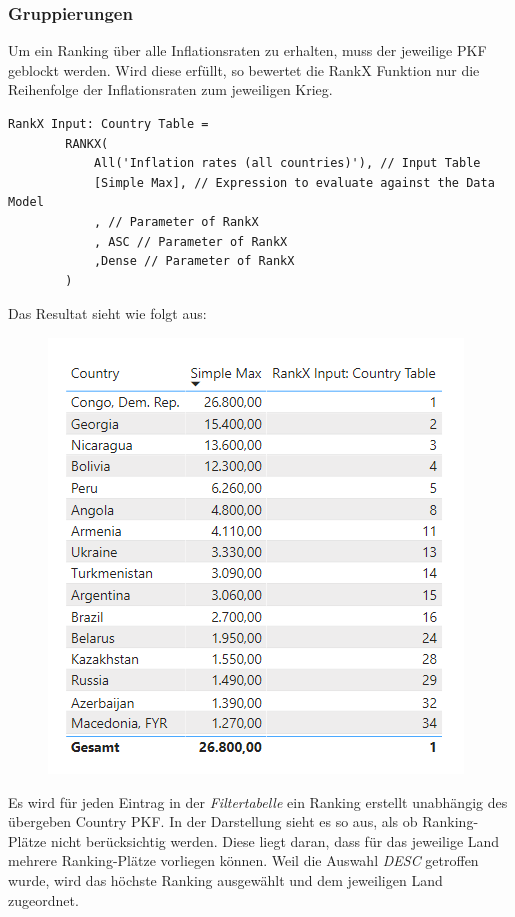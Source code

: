\subsubsection{Gruppierungen}
Um ein Ranking über alle Inflationsraten zu erhalten, muss der jeweilige \gls{PKF} geblockt werden. Wird diese erfüllt, so bewertet die RankX Funktion nur die Reihenfolge der Inflationsraten zum jeweiligen Krieg.
\begin{lstlisting}[style=DAX]
	RankX Input: Country Table = 
		RANKX(
			All('Inflation rates (all countries)'), // Input Table
			[Simple Max], // Expression to evaluate against the Data Model
			, // Parameter of RankX
			, ASC // Parameter of RankX
			,Dense // Parameter of RankX
		)
\end{lstlisting}
Das Resultat sieht wie folgt aus:
\begin{figure}[H]
	\centering
	\includegraphics[scale = 0.3]{attachment/chapter_1/Scc152}
\end{figure}
Es wird für jeden Eintrag in der \textit{Filtertabelle} ein Ranking erstellt unabhängig des übergeben Country \gls{PKF}. In der Darstellung sieht es so aus, als ob Ranking-Plätze nicht berücksichtig werden. Diese liegt daran, dass für das jeweilige Land mehrere Ranking-Plätze vorliegen können. Weil die Auswahl \textit{DESC} getroffen wurde, wird das höchste Ranking ausgewählt und dem jeweiligen Land zugeordnet.


